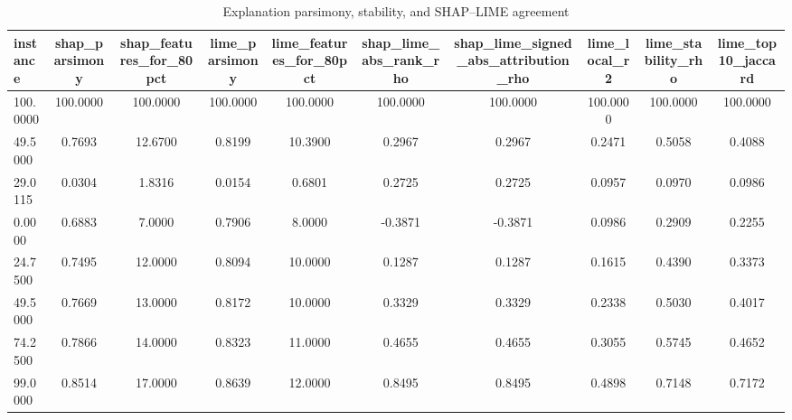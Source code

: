 \begin{table}
\centering
\caption{Explanation parsimony, stability, and SHAP--LIME agreement}
\label{tab:explanation_quality}
\begin{tabular}{lccccccccc}
\toprule
instance & shap_parsimony & shap_features_for_80pct & lime_parsimony & lime_features_for_80pct & shap_lime_abs_rank_rho & shap_lime_signed_abs_attribution_rho & lime_local_r2 & lime_stability_rho & lime_top10_jaccard \\
\midrule
100.0000 & 100.0000 & 100.0000 & 100.0000 & 100.0000 & 100.0000 & 100.0000 & 100.0000 & 100.0000 & 100.0000 \\
49.5000 & 0.7693 & 12.6700 & 0.8199 & 10.3900 & 0.2967 & 0.2967 & 0.2471 & 0.5058 & 0.4088 \\
29.0115 & 0.0304 & 1.8316 & 0.0154 & 0.6801 & 0.2725 & 0.2725 & 0.0957 & 0.0970 & 0.0986 \\
0.0000 & 0.6883 & 7.0000 & 0.7906 & 8.0000 & -0.3871 & -0.3871 & 0.0986 & 0.2909 & 0.2255 \\
24.7500 & 0.7495 & 12.0000 & 0.8094 & 10.0000 & 0.1287 & 0.1287 & 0.1615 & 0.4390 & 0.3373 \\
49.5000 & 0.7669 & 13.0000 & 0.8172 & 10.0000 & 0.3329 & 0.3329 & 0.2338 & 0.5030 & 0.4017 \\
74.2500 & 0.7866 & 14.0000 & 0.8323 & 11.0000 & 0.4655 & 0.4655 & 0.3055 & 0.5745 & 0.4652 \\
99.0000 & 0.8514 & 17.0000 & 0.8639 & 12.0000 & 0.8495 & 0.8495 & 0.4898 & 0.7148 & 0.7172 \\
\bottomrule
\end{tabular}
\end{table}
